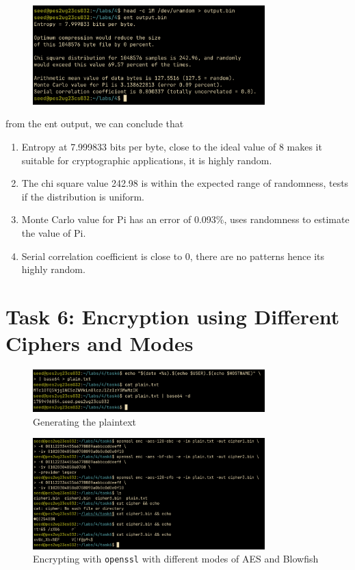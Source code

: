 \documentclass[12pt,a4paper]{article}
\begin{document}
\begin{figure}[H]
    \centering
    \includegraphics[width=0.8\textwidth]{./images/task5-2.png} 
\end{figure}

from the ent output, we can conclude that

\begin{enumerate}
    \item Entropy at 7.999833 bits per byte, close to the ideal value of 8 makes it suitable for cryptographic applications, it is highly random.
    \item The chi square value 242.98 is within the expected range of randomness, tests if the distribution is uniform.
    \item Monte Carlo value for Pi has an error of 0.093\%, uses randomness to estimate the value of Pi.
    \item Serial correlation coefficient is close to 0, there are no patterns hence its highly random.
\end{enumerate}

\pagebreak

\section{Task 6: Encryption using Different Ciphers and Modes}

\begin{figure}[H]
    \centering
    \includegraphics[width=0.8\textwidth]{./images/task6-1.png} 
    \caption{Generating the plaintext}
\end{figure}

\begin{figure}[H]
    \centering
    \includegraphics[width=0.8\textwidth]{./images/task6-2.png} 
    \caption{Encrypting with \texttt{openssl} with different modes of AES and Blowfish}
\end{figure}
\end{document}

